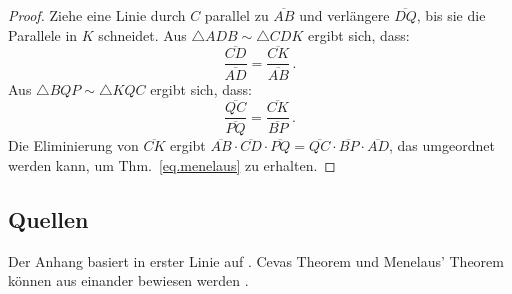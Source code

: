 \begin{proof}
Ziehe eine Linie durch $C$ parallel zu $\overline{AB}$ und verlängere $\overline{DQ}$, bis sie die Parallele in $K$ schneidet. Aus $\triangle ADB \sim \triangle CDK$ ergibt sich, dass:
\begin{equation*}
\displaystyle\frac{\overline{CD}}{\overline{AD}}=\displaystyle\frac{\overline{CK}}{\overline{AB}}\,.
\end{equation*}
Aus $\triangle BQP\sim \triangle KQC$ ergibt sich, dass:
\begin{equation*}
\displaystyle\frac{\overline{QC}}{\overline{PQ}}=\displaystyle\frac{\overline{CK}}{\overline{BP}}\,.
\end{equation*}
Die Eliminierung von $\overline{CK}$ ergibt
$\overline{AB}\cdot\overline{CD}\cdot\overline{PQ}=\overline{QC}\cdot\overline{BP}\cdot\overline{AD}$, das umgeordnet werden kann, um Thm.~\ref{eq.menelaus} zu erhalten.
\end{proof}


\subsection*{Quellen}

Der Anhang basiert in erster Linie auf \cite{gelfand}. Cevas Theorem und Menelaus' Theorem können aus einander bewiesen werden \cite{silvester}.
